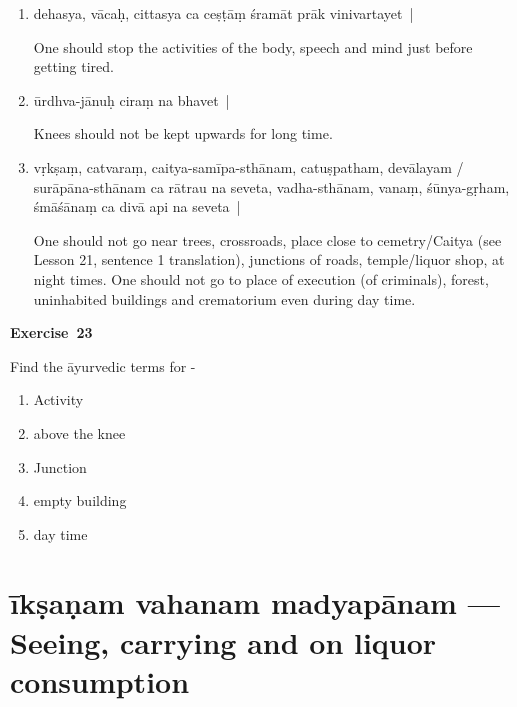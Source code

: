 \begin{enumerate}
\itemsep=0pt
\item {}

dehasya, vācaḥ, cittasya ca ceṣṭāṃ śramāt prāk vinivartayet~| 

One should stop the activities of the body, speech and mind just before getting tired. 

\item {}

ūrdhva-jānuḥ ciraṃ na bhavet~| 

Knees should not be kept upwards for long time. 

\item {}

vṛkṣaṃ, catvaraṃ, caitya-samīpa-sthānam, catuṣpatham, devālayam / surāpāna-sthānam ca rātrau na seveta,  vadha-sthānam, vanaṃ, śūnya-gṛham, śmāśānaṃ ca divā api na seveta~|      

One should not go near trees, crossroads, place close to cemetry/Caitya (see Lesson 21, sentence 1 translation), junctions of roads, temple/liquor shop, at night times. One should not go to place of execution (of criminals), forest, uninhabited  buildings and crematorium even during day time.
\end{enumerate}

\centerline{\textbf{Exercise~23}}

Find the āyurvedic terms for -
\begin{enumerate}
\itemsep=0pt
\renewcommand{\theenumi}{\alph{enumi}}
\renewcommand{\labelenumi}{\theenumi.}
\item Activity
\item above the knee
\item Junction
\item empty building 
\item day time
\end{enumerate}

\chapter{īkṣaṇam vahanam madyapānam --- Seeing, carrying and on liquor consumption}

